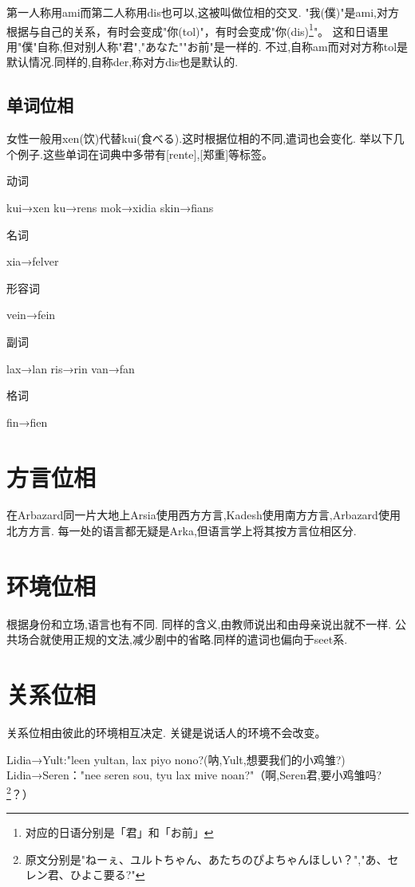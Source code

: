 第一人称用ami而第二人称用dis也可以,这被叫做位相的交叉.
"我(僕)"是ami,对方根据与自己的关系，有时会变成"你(tol)"，有时会变成"你(dis)\footnote{对应的日语分别是「君」和「お前」}"。
这和日语里用"僕"自称,但对别人称"君","あなた""お前"是一样的.
不过,自称am而对对方称tol是默认情况.同样的,自称der,称对方dis也是默认的.

\subsection{单词位相}

女性一般用xen(饮)代替kui(食べる).这时根据位相的不同,遣词也会变化.
举以下几个例子.这些单词在词典中多带有[rente],[郑重]等标签。

动词

kui→xen
ku→rens
mok→xidia
skin→fians

名词

xia→felver

形容词

vein→fein

副词

lax→lan
ris→rin
van→fan

格词

fin→fien

\section{方言位相}

在Arbazard同一片大地上Arsia使用西方方言,Kadesh使用南方方言,Arbazard使用北方方言.
每一处的语言都无疑是Arka,但语言学上将其按方言位相区分.


\section{环境位相}

根据身份和立场,语言也有不同.
同样的含义,由教师说出和由母亲说出就不一样.
公共场合就使用正规的文法,减少剧中的省略.同样的遣词也偏向于seet系.

\section{关系位相}
关系位相由彼此的环境相互决定.
关键是说话人的环境不会改变。

Lidia→Yult:"leen yultan, lax piyo nono?(呐,Yult,想要我们的小鸡雏?)
Lidia→Seren："nee seren sou, tyu lax mive noan?"（啊,Seren君,要小鸡雏吗?
\footnote{原文分别是"ねーぇ、ユルトちゃん、あたちのぴよちゃんほしい？","あ、セレン君、ひよこ要る?"
}？）

